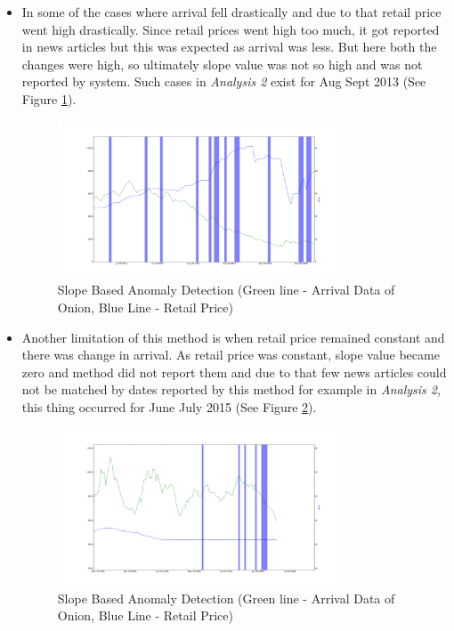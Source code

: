 \begin{itemize}
			\item In some of the cases where arrival fell drastically and due to that retail price went high drastically. Since retail prices went high too much, it got reported in news articles but this was expected as arrival was less. But here both the changes were high, so ultimately slope value was not so high and was not reported by system. Such cases in \textit{Analysis 2} exist for Aug Sept 2013  (See Figure \ref{fig:12125}).
			
			\begin{figure}[H]
		    	\centering
  		    	\includegraphics[width=0.8\textwidth]{graphs/12125.png}
		    	\caption{Slope Based Anomaly Detection (Green line - Arrival Data of Onion, Blue Line - Retail Price)}
		    	\label{fig:12125}
			\end{figure}
			
			\item Another limitation of this method is when retail price remained constant and there was change in arrival. As retail price was constant, slope value became zero and method did not report them and due to that few news articles could not be matched by dates reported by this method for example in \textit{Analysis 2}, this thing occurred for June July 2015  (See Figure \ref{fig:12126}).
			
			\begin{figure}[H]
		    	\centering
  		    	\includegraphics[width=0.8\textwidth]{graphs/12126.png}
		    	\caption{Slope Based Anomaly Detection (Green line - Arrival Data of Onion, Blue Line - Retail Price)}
		    	\label{fig:12126}
			\end{figure}
			
		\end{itemize}


